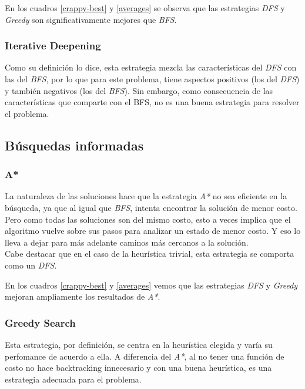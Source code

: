 \documentclass[a4paper,10pt]{article}
\begin{document}
\begin{itemize}
    En los cuadros \ref{crappy-best} y \ref{averages} se observa que las estrategias \textit{DFS} y \textit{Greedy} son significativamente mejores que \textit{BFS}.

    \subsubsection{Iterative Deepening}

    Como su definición lo dice, esta estrategia mezcla las características del \textit{DFS} con las del \textit{BFS}, por lo que para este problema, tiene aspectos positivos (los del \textit{DFS}) y también negativos (los del \textit{BFS}). Sin embargo, como consecuencia de las características que comparte con el BFS, no es una buena estrategia para resolver el problema.

\subsection{Búsquedas informadas}
    
    \subsubsection{A*}
    
    La naturaleza de las soluciones hace que la estrategia \textit{A*} no sea eficiente en la búsqueda, ya que al igual que \textit{BFS}, intenta encontrar la solución de menor costo.
    Pero como todas las soluciones son del mismo costo, esto a veces implica que el algoritmo vuelve sobre sus pasos para analizar un estado de menor costo.
    Y eso lo lleva a dejar para más adelante caminos más cercanos a la solución. \\
    Cabe destacar que en el caso de la heurística trivial, esta estrategia se comporta como un \textit{DFS}.

    En los cuadros \ref{crappy-best} y \ref{averages} vemos que las estrategias \textit{DFS} y \textit{Greedy} mejoran ampliamente los resultados de \textit{A*}.

    \subsubsection{Greedy Search}
    
    Esta estrategia, por definición, se centra en la heurística elegida y varía su perfomance de acuerdo a ella.
    A diferencia del \textit{A*}, al no tener una función de costo no hace backtracking innecesario y con una buena heurística, es una estrategia adecuada para el problema.


\end{itemize}
\end{document}

